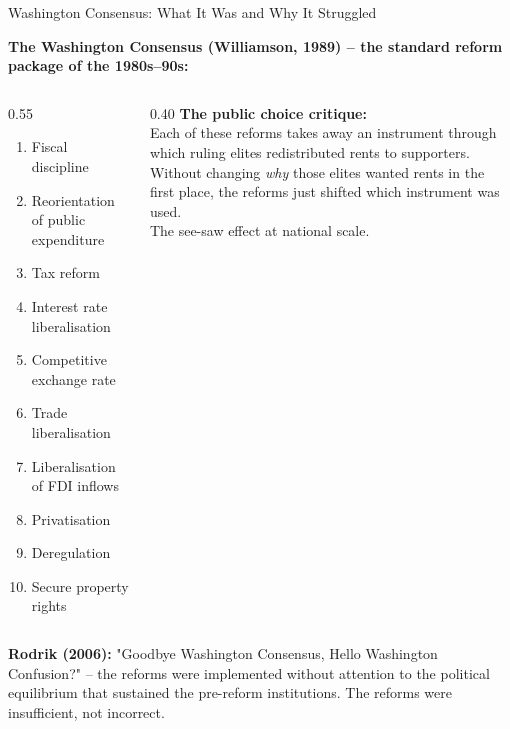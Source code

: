 \documentclass[10pt]{beamer}
\begin{document}
\begin{frame}[allowframebreaks]{Washington Consensus: What It Was and Why It Struggled}

\textbf{The Washington Consensus (Williamson, 1989) -- the standard reform package of the 1980s--90s:}


\begin{columns}[T]
\begin{column}{0.55\textwidth}
\begin{enumerate}
\item Fiscal discipline
\item Reorientation of public expenditure
\item Tax reform
\item Interest rate liberalisation
\item Competitive exchange rate
\item Trade liberalisation
\item Liberalisation of FDI inflows
\item Privatisation
\item Deregulation
\item Secure property rights
\end{enumerate}
\end{column}
\begin{column}{0.40\textwidth}
\small
\textbf{The public choice critique:}\\[4pt]
Each of these reforms takes away an instrument through which ruling elites redistributed rents to supporters.\\[4pt]
Without changing \emph{why} those elites wanted rents in the first place, the reforms just shifted which instrument was used.\\[4pt]
\alert{The see-saw effect at national scale.}
\end{column}
\end{columns}


\textbf{Rodrik (2006):} "Goodbye Washington Consensus, Hello Washington Confusion?" -- the reforms were implemented without attention to the political equilibrium that sustained the pre-reform institutions. The reforms were insufficient, not incorrect.
\end{frame}
\end{document}
